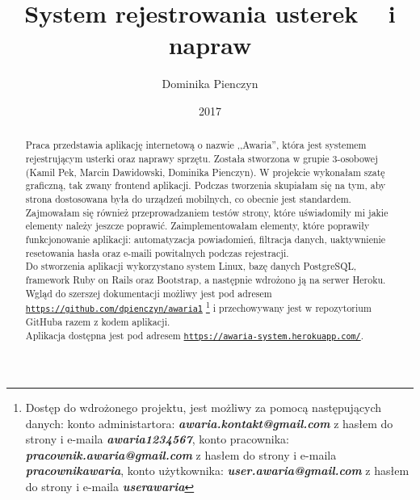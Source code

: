 \documentclass[openright]{xmgr}
\author   {Dominika Pienczyn}
\title    {System rejestrowania usterek ~ i napraw}
\date     {2017}
\begin{document}
	
	\begin{abstract}
		Praca przedstawia aplikację internetową o nazwie ,,Awaria'', która jest systemem rejestrującym usterki oraz naprawy sprzętu. Została stworzona w grupie 3-osobowej (Kamil Pek, Marcin Dawidowski, Dominika Pienczyn). W projekcie wykonałam szatę graficzną, tak zwany frontend aplikacji. Podczas tworzenia skupiałam się na tym, aby strona dostosowana była do urządzeń mobilnych, co obecnie jest standardem. Zajmowałam się również przeprowadzaniem testów strony, które uświadomiły mi jakie elementy należy jeszcze poprawić. Zaimplementowałam elementy, które poprawiły funkcjonowanie aplikacji: automatyzacja powiadomień, filtracja danych, uaktywnienie resetowania hasła oraz e-maili powitalnych podczas rejestracji.\\ 
		\indent Do stworzenia aplikacji wykorzystano system Linux, bazę danych PostgreSQL, framework Ruby on Rails oraz Bootstrap, a następnie wdrożono ją na serwer Heroku.\\
		\indent Wgląd do szerszej dokumentacji możliwy jest pod adresem \texttt{\url{https://github.com/dpienczyn/awaria1}} \footnote{Dostęp do wdrożonego projektu, jest możliwy za pomocą następujących danych: konto administartora: \textbf{\textit{awaria.kontakt@gmail.com}} z hasłem do strony i e-maila \textbf{\textit{awaria1234567}}, konto pracownika:  \textbf{\textit{pracownik.awaria@gmail.com}} z hasłem do strony i e-maila \textbf{\textit{pracownikawaria}}, konto użytkownika: \textbf{\textit{user.awaria@gmail.com}} z hasłem do strony i e-maila \textbf{\textit{userawaria}}} i przechowywany jest w repozytorium GitHuba razem z kodem aplikacji.\\
		\indent Aplikacja dostępna jest pod adresem \texttt{\url{https://awaria-system.herokuapp.com/}}.
	\end{abstract}
	
	
	\maketitle
	
	\introduction
	
\end{document}
